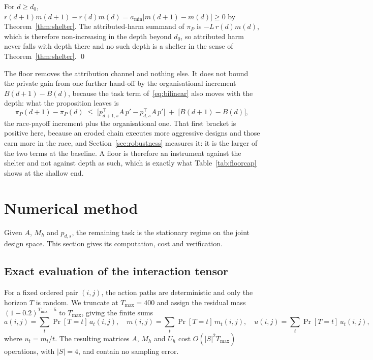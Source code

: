 \documentclass[a4paper,fleqn]{cas-sc}
\newcommand{\piP}{\pi_{P}}
\begin{document}
\begin{pf}
For $d\ge d_{0}$, $r(d+1)m(d+1)-r(d)m(d)=a_{\min}\bigl[m(d+1)-m(d)\bigr]\ge0$
by Theorem~\ref{thm:shelter}. The attributed-harm summand of $\piP$
is $-L\,r(d)m(d)$, which is therefore non-increasing in the depth beyond
$d_{0}$, so attributed harm never falls with depth there and no such depth is a
shelter in the sense of Theorem~\ref{thm:shelter}. \qed
\end{pf}

The floor removes the attribution channel and nothing else. It does not bound
the private gain from one further hand-off by the organisational increment
$B(d{+}1)-B(d)$, because the task term of~\eqref{eq:bilinear} also moves with
the depth: what the proposition leaves is
\[
  \piP(d{+}1)-\piP(d)\;\le\;
  \bigl[p_{d+1,s}^{\top}A\,p'-p_{d,s}^{\top}A\,p'\bigr]
  \;+\;\bigl[B(d{+}1)-B(d)\bigr],
\]
the race-payoff increment plus the organisational one. That first bracket is
positive here, because an eroded chain executes more aggressive designs and
those earn more in the race, and Section~\ref{sec:robustness} measures it: it
is the larger of the two terms at the baseline. A floor is therefore an
instrument against the shelter and not against depth as such, which is exactly
what Table~\ref{tab:floorcap} shows at the shallow end.

\section{Numerical method}
\label{sec:numerics}

Given $A$, $M_h$ and $p_{d,s}$, the remaining task is the stationary regime on
the joint design space. This section gives its computation, cost and
verification.

\subsection{Exact evaluation of the interaction tensor}
\label{sec:exact}

For a fixed ordered pair $(i,j)$, the action paths are deterministic and only
the horizon $T$ is random. We truncate at $T_{\max}=400$ and assign the residual
mass $(1-0.2)^{T_{\max}-5}$ to $T_{\max}$, giving the finite sums
\begin{equation}
  a(i,j) = \sum_{t} \Pr[T=t]\, a_{t}(i,j),
  \quad
  m(i,j) = \sum_{t} \Pr[T=t]\, m_{t}(i,j),
  \quad
  u(i,j) = \sum_{t} \Pr[T=t]\, u_{t}(i,j),
  \label{eq:horizonsum}
\end{equation}
where $u_t=m_t/t$. The resulting matrices $A$, $M_h$ and $U_h$ cost
$O(|S|^2T_{\max})$ operations, with $|S|=4$, and contain no sampling error.
\end{document}
